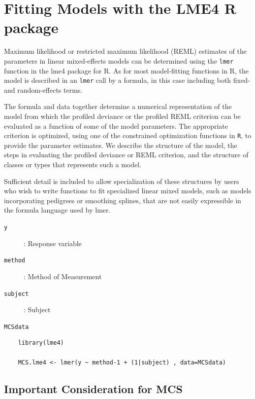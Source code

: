 \documentclass[Main.tex]{subfiles}
\begin{document}
\section{Fitting Models with the LME4 R package}
Maximum likelihood or restricted maximum likelihood (REML) estimates of the parameters in linear mixed-effects models can be determined using the \texttt{lmer} function in the lme4 package for R. As for most model-fitting functions in R, the model is described in an \texttt{lmer} call by a formula, in this case including both fixed- and random-effects terms. 

The formula and data together determine a numerical representation of the model from which the profiled deviance or the profiled REML criterion can be evaluated as a function of some of the model parameters. The appropriate criterion is optimized, using one of the constrained optimization functions in \texttt{R}, to provide the parameter estimates. We describe the structure of the model, the steps in evaluating the profiled deviance or REML criterion, and the structure of classes or types that represents such a model. 

Sufficient detail is included to allow specialization of these structures by users who wish to write functions to fit specialized linear mixed models, such as models incorporating pedigrees or smoothing splines, that are not easily expressible in the formula language used by lmer.


\begin{description}
	\item[\texttt{y}] : Response variable
	\item[\texttt{method}] : Method of Measurement
	\item[\texttt{subject}] : Subject
	\item[\texttt{MCSdata}] 
\end{description}
\begin{framed}
	\begin{verbatim}
	library(lme4)
	
	MCS.lme4 <- lmer(y ~ method-1 + (1|subject) , data=MCSdata)
	\end{verbatim}
\end{framed}
\newpage

\subsection{Important Consideration for MCS}
\end{document}
